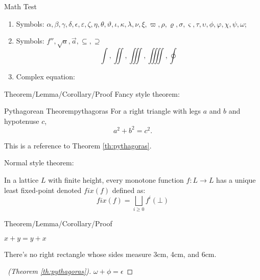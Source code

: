 \begin{frame}{Math Test}
    \begin{enumerate}
        \item Symbols: $\alpha,\beta,\gamma,\delta,\epsilon,\varepsilon,\zeta,\eta,\theta,\vartheta,\iota,\kappa,\lambda,\nu,\xi,\varpi,\rho,\varrho,\sigma,\varsigma,\tau,\upsilon,\phi,\varphi,\chi,\psi,\omega$;
        \item Symbols: $f'',\sqrt{a},\overrightarrow{a},\subseteq,\supseteq$
        \[\int,\iint,\iiint,\iiiint,\oint\]
        \item Complex equation:
    \end{enumerate}
\end{frame}

\begin{frame}{Theorem/Lemma/Corollary/Proof}
    Fancy style theorem:
	\begin{theo}{Pythagorean Theorem}{pythagoras}
		For a right triangle with legs $a$ and $b$ and hypotenuse $c$,
		\[
		a^2 + b^2 = c^2. 
		\]
	\end{theo}
	This is a reference to Theorem \ref{th:pythagoras}.
    
    Normal style theorem:
    \begin{theorem}
        In a lattice $L$ with finite height, every monotone function $f : L \rightarrow L$
        has a unique least fixed-point denoted $fix (f)$ defined as:
        \[
        fix (f) = \bigsqcup_{i \geq 0}f^i(\bot)
        \]
    \end{theorem}
\end{frame}

\begin{frame}{Theorem/Lemma/Corollary/Proof}
    \begin{lemma}
        $ x + y = y + x  $
    \end{lemma}
    
    \begin{corollary}
        There's no right rectangle whose sides measure 3cm, 4cm, and 6cm.
    \end{corollary}
    
    \begin{proof}[\proofname\ (Theorem \ref{th:pythagoras})]
        $\omega +\phi = \epsilon $
    \end{proof}
\end{frame}

